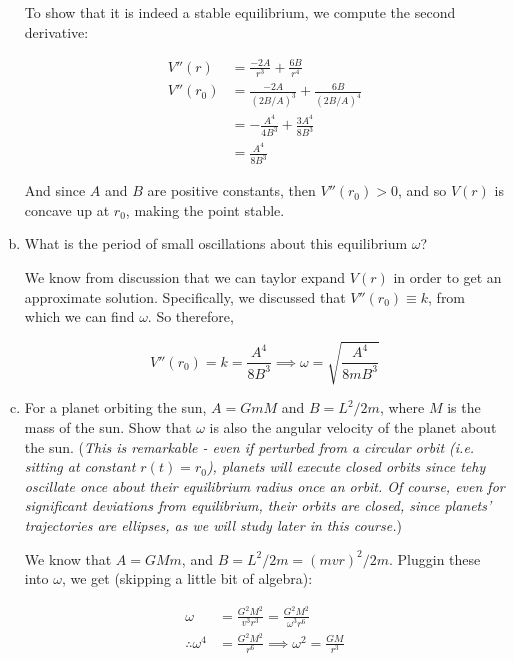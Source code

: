\documentclass[10pt]{article}
\begin{document}
\begin{enumerate}[(a)]
\begin{solution}
            To show that it is indeed a stable equilibrium, we compute the second derivative: 

            \begin{align*}
                V''(r) &= \frac{-2A}{r^3} + \frac{6B}{r^4}\\
                V''(r_0) &= \frac{-2A}{\left(2B/A\right)^3} + \frac{6B}{(2B/A)^4}\\
                &= -\frac{A^4}{4B^3} + \frac{3A^4}{8B^3}\\
                &= \frac{A^4}{8B^3}
            \end{align*}

            And since $A$ and $B$ are positive constants, then $V''(r_0) > 0$, and so $V(r)$ is concave up at $r_0$, making the point stable.
        \end{solution}
        \item What is the period of small oscillations about this equilibrium $\omega$?
        
        \begin{solution}
            We know from discussion that we can taylor expand $V(r)$ in order to get an approximate solution. Specifically, we discussed that $V''(r_0) \equiv k$, from which we can find $\omega$. So therefore, 

            \[ V''(r_0) = k = \frac{A^4}{8B^3} \implies \omega = \sqrt{\frac{A^4}{8mB^3}}\]
        \end{solution}
        \item For a planet orbiting the sun, $A = GmM$ and $B = L^2/2m$, where $M$ is the mass of the sun. Show that $\omega$ is also the angular velocity of the planet about the sun. (\textit{This is remarkable - even if perturbed from a circular orbit (i.e. sitting at constant $r(t) = r_0$), planets will execute closed orbits since tehy oscillate once about their equilibrium radius once an orbit. Of course, even for significant deviations from equilibrium, their orbits are closed, since planets' trajectories are ellipses, as we will study later in this course.})
        
        \begin{solution}
            We know that $A = GMm$, and $B = L^2/2m = (mvr)^2/2m$. Pluggin these into $\omega$, we get (skipping a little bit of algebra):

            \begin{align*}
                \omega &= \frac{G^2M^2}{v^3r^3} = \frac{G^2M^2}{\omega^3r^6}\\
                \therefore \omega^4 &= \frac{G^2M^2}{r^6} \implies \omega^2 = \frac{GM}{r^3}
            \end{align*}


\end{solution}
\end{enumerate}
\end{document}
